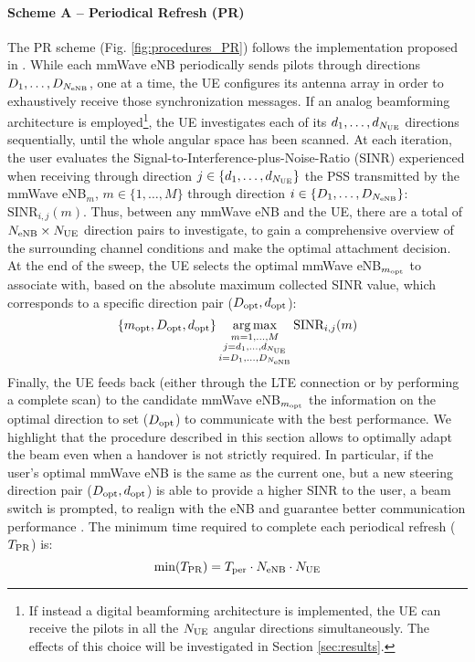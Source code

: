 \documentclass[conference]{IEEEtran}
\DeclareMathOperator*{\argmax}{arg\,max}
\def\beq{\begin{equation}}
\def\eeq{\end{equation}}
\begin{document}
\paragraph{\textbf{Scheme A -- Periodical Refresh (PR)}}

The PR scheme (Fig. \ref{fig:procedures_PR}) follows the implementation proposed in \cite{Giordani_magazineIA_2016}. While each mmWave eNB periodically sends pilots through  directions $D_1,\dots,D_{N_{\rm eNB}}$, one at a time, the UE configures its antenna array in order to exhaustively receive those synchronization messages. 
If an analog beamforming architecture is employed\footnote{If instead a digital beamforming architecture is  implemented, the UE can receive the pilots in all the $N_{\rm UE}$ angular directions simultaneously. The effects of this choice will be investigated in Section \ref{sec:results}.}, the UE investigates each of its $d_1,\dots,d_{N_{\rm UE}}$ directions sequentially, until the whole angular space has been scanned.
At each iteration, the user evaluates the Signal-to-Interference-plus-Noise-Ratio (SINR) experienced when receiving through direction $j\in \{d_1,\dots,d_{N_{\rm UE}}\}$ the PSS transmitted by the mmWave eNB$_m$, $m\in \{1,\dots ,M\}$ through direction   $i\in \{D_1,\dots,D_{N_{\rm eNB}}\}$: $\text{SINR}_{i,j}(m) $.
 Thus, between any mmWave eNB and the UE, there
are a total of $N_{\rm eNB} \times N_{\rm UE}$ direction pairs to investigate, to gain a comprehensive overview of the surrounding channel conditions and make the optimal attachment decision.
At the end of the sweep, the UE selects the optimal mmWave eNB$_{m_{\rm opt}}$ to associate with, based on the absolute maximum collected SINR value, which corresponds to a specific direction pair ($D_{\rm opt}, d_{\rm opt}$):
\beq
\{m_{\rm opt}, D_{\rm opt}, d_{\rm opt} \} \argmax_{\substack{m =1,\dots, M\\j=d_1,\dots,d_{N_{\rm UE}}\\ i =D_1,\dots,D_{N_{\rm eNB}}} } \text{SINR}_{i,j}(m)
\label{eq:max_SINR}
\eeq
Finally, the UE feeds back (either through the LTE connection or by performing a complete scan) to the candidate  mmWave eNB$_{m_{\rm opt}}$ the information on the optimal direction to set  ($D_{\rm opt}$) to communicate with the best performance.
We highlight that the
procedure described in this section allows  to optimally adapt the beam even when a handover is
not strictly required. In particular, if the user's optimal mmWave eNB is the same as the current
one, but a new steering direction pair ($D_{\rm opt},d_{\rm opt}$) is able to provide a higher SINR to the
user, a beam switch is prompted, to realign with the eNB and guarantee better communication
performance \cite{JSAC_2017}. The minimum time required to complete each periodical refresh ($T_{\rm PR}$) is:
\beq
\min(T_{\rm PR}) = T_{\rm per} \cdot N_{\rm eNB} \cdot N_{\rm UE}
\eeq
\end{document}
